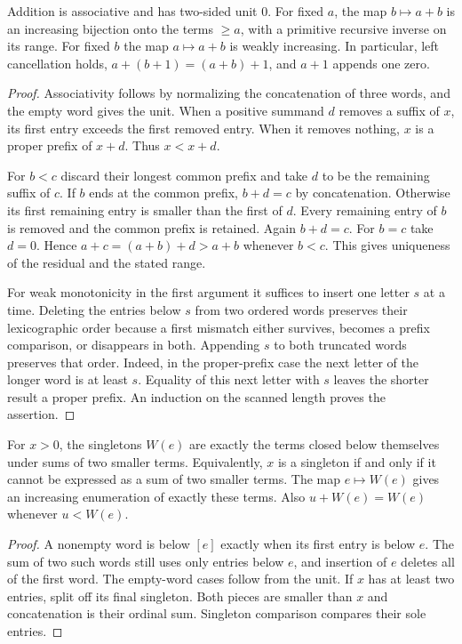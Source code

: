 \begin{theorem}\label{th:ordinary-add}
Addition is associative and has two-sided unit $0$. For fixed $a$, the
map $b\mapsto a+b$ is an increasing bijection onto the terms $\ge a$,
with a primitive recursive inverse on its range. For fixed $b$ the map
$a\mapsto a+b$ is weakly increasing. In particular, left cancellation
holds, $a+(b+1)=(a+b)+1$, and $a+1$ appends one zero.
\end{theorem}
\begin{proof}
Associativity follows by normalizing the concatenation of three words,
and the empty word gives the unit. When a positive summand $d$ removes
a suffix of $x$, its first entry exceeds the first removed entry.
When it removes nothing, $x$ is a proper prefix of $x+d$. Thus $x<x+d$.

For $b<c$ discard their longest common prefix and take $d$ to be the
remaining suffix of $c$. If $b$ ends at the common prefix, $b+d=c$ by
concatenation. Otherwise its first remaining entry is smaller than the
first of $d$. Every remaining entry of $b$ is removed and the common
prefix is retained. Again $b+d=c$. For $b=c$ take $d=0$. Hence
$a+c=(a+b)+d>a+b$ whenever $b<c$. This gives uniqueness of the residual
and the stated range.

For weak monotonicity in the first argument it suffices to insert one
letter $s$ at a time. Deleting the entries below $s$ from two ordered
words preserves their lexicographic order because a first mismatch either
survives, becomes a prefix comparison, or disappears in both.
Appending $s$ to both truncated words preserves that order. Indeed, in
the proper-prefix case the next letter of the longer word is at least
$s$. Equality of this next letter with $s$ leaves the shorter result a
proper prefix. An induction on the scanned length proves the assertion.
\end{proof}

\begin{theorem}\label{th:add-indecomp}
For $x>0$, the singletons $W(e)$ are exactly the terms closed below themselves under sums of two smaller terms. Equivalently, $x$ is a singleton if and only if it cannot be expressed as a sum of two smaller terms. The map $e\mapsto W(e)$ gives
an increasing enumeration of exactly these terms. Also $u+W(e)=W(e)$
whenever $u<W(e)$.
\end{theorem}
\begin{proof}
A nonempty word is below $[e]$ exactly when its first entry is below
$e$. The sum of two such words still uses only entries below $e$, and
insertion of $e$ deletes all of the first word. The empty-word cases follow
from the unit. If $x$ has at least two entries, split off its final
singleton. Both pieces are smaller than $x$ and concatenation is their
ordinal sum. Singleton comparison compares their sole entries.
\end{proof}

